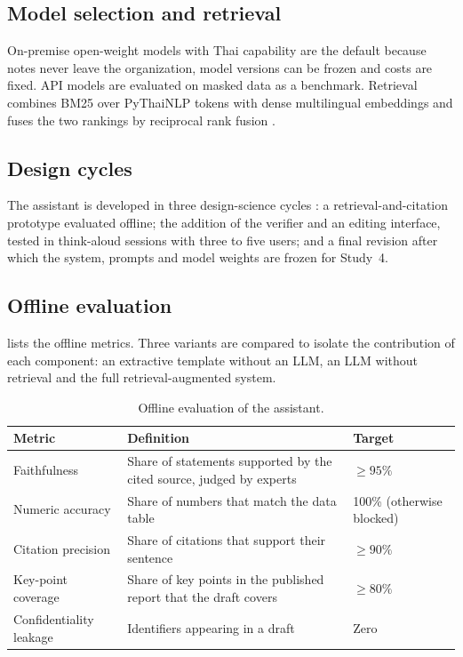\documentclass[11pt]{article}
\begin{document}
\subsection{Model selection and retrieval}
On-premise open-weight models with Thai capability \citep{pipatanakul2023typhoon} are the default because notes never leave the organization, model versions can be frozen and costs are fixed. API models are evaluated on masked data as a benchmark. Retrieval combines BM25 over PyThaiNLP tokens with dense multilingual embeddings and fuses the two rankings by reciprocal rank fusion \citep{robertson2009bm25,cormack2009rrf}.

\subsection{Design cycles}
The assistant is developed in three design-science cycles \citep{peffers2007dsrm}: a retrieval-and-citation prototype evaluated offline; the addition of the verifier and an editing interface, tested in think-aloud sessions with three to five users; and a final revision after which the system, prompts and model weights are frozen for Study~4.

\subsection{Offline evaluation}
 lists the offline metrics. Three variants are compared to isolate the contribution of each component: an extractive template without an LLM, an LLM without retrieval and the full retrieval-augmented system.

\begin{table}[tbp]
\centering\small
\caption{Offline evaluation of the assistant.}\label{tab:offline}
\begin{tabularx}{\textwidth}{@{}L{3.4cm}YL{3.4cm}@{}}
\toprule
Metric & Definition & Target \\
\midrule
Faithfulness & Share of statements supported by the cited source, judged by experts & $\geq 95\%$ \\
Numeric accuracy & Share of numbers that match the data table & 100\% (otherwise blocked) \\
Citation precision & Share of citations that support their sentence & $\geq 90\%$ \\
Key-point coverage & Share of key points in the published report that the draft covers & $\geq 80\%$ \\
Confidentiality leakage & Identifiers appearing in a draft & Zero \\
\bottomrule
\end{tabularx}
\end{table}
\end{document}
